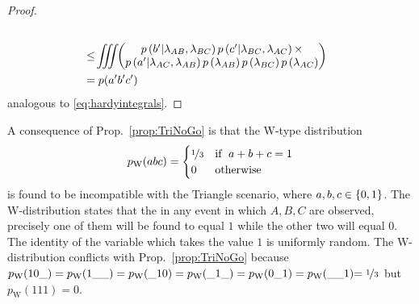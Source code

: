 \begin{proof}
\begin{align}
\\\nonumber &\leq\!\int\!\!\!\!\int\!\!\!\!\int
\!\!\begin{pmatrix}p\left(\nbp|\lambda_{AB},\lambda_{BC}\right) p\left(\ncp|\lambda_{BC},\lambda_{AC}\right)\times\\ p\left(\nap|\lambda_{AC},\lambda_{AB}\right)p\left(\lambda_{AB}\right)p\left(\lambda_{BC}\right) p\left(\lambda_{AC}\right)\end{pmatrix}
\\\nonumber&=\p{\nap\nbp\ncp}
\end{align}
analogous to \cref{eq:hardyintegrals}.\end{proof}


A consequence of Prop.~\ref{prop:TriNoGo} is that the W-type distribution
\begin{align}\label{eq:wdistribution}
p_{\text{W}}(abc)=\begin{cases}\nicefrac{1}{3}&\text{if }\; a+b+c=1 \\ 0&\text{otherwise}\end{cases}
\end{align}
is found to be incompatible with the Triangle scenario, where $a,b,c\in\lbrace{0,1\rbrace}$. The W-distribution states that the in any event in which $A,B,C$ are observed, precisely one of them will be found to equal $1$ while the other two will equal $0$. The identity of the variable which takes the value $1$ is uniformly random. The W-distribution conflicts with Prop.~\ref{prop:TriNoGo} because ${p_{\text{W}}(10\_)}={p_{\text{W}}(1\_\_)}={p_{\text{W}}(\_10)}={p_{\text{W}}(\_1\_)}={p_{\text{W}}(0\_1)}={p_{\text{W}}(\_\_1)}{=\nicefrac{1}{3}}$ but ${p_{\text{W}}(111)}=0$.%


